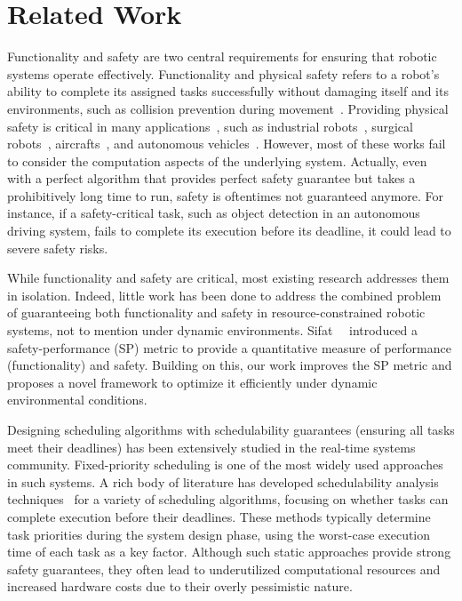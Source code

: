 	\section{Related Work}

	Functionality and safety are two central requirements for ensuring that robotic systems operate
	effectively. Functionality and physical safety refers to a robot's ability to complete its assigned
	tasks successfully without damaging itself and its environments, such as collision prevention during
	movement~\cite{PARIGIPOLVERINI201725, safety20, Vicentini19TRO_Safety, Terra20ICCAR}.
    Providing physical safety is critical in many
	applications~\cite{Vasic2013SafetyII,Ames2016ControlBF, Fisac2017AGS, Xiong2022MultiLayeredSC,
	Singletary2020SafetyCriticalKC}, such as industrial robots~\cite{Bi2021SafetyAM,
	RodrguezGuerra2021HumanRobotIR}, surgical robots~\cite{Haidegger2022RobotAssistedMI},
	aircrafts~\cite{Zipay2016TheUF, Molnr2021ModelFreeSC},
    and autonomous vehicles~\cite{Zheng2023LearningBasedSC, Wang2023PosterEA}.
    However, most of these works fail to consider the computation aspects of the underlying system.
    Actually, even with a perfect algorithm that provides perfect safety guarantee but takes a
    prohibitively long time to run, safety is oftentimes not guaranteed anymore.
    For instance, if a safety-critical task, such as object detection in an autonomous driving system,
    fails to complete its execution before its deadline, it could lead to severe safety risks.

    While functionality and safety are critical, most existing research addresses them in isolation.
    Indeed, little work has been done to address the combined problem of guaranteeing both
    functionality and safety in resource-constrained robotic systems, not to mention under dynamic
    environments. Sifat~\etal~\cite{Ash23RAL} introduced a safety-performance (SP) metric to provide a
    quantitative measure of performance (functionality) and safety. Building on this, our work improves
    the SP metric and proposes a novel framework to optimize it efficiently under dynamic environmental
    conditions.


	Designing scheduling algorithms with schedulability guarantees (\ie ensuring all tasks meet their
	deadlines) has been extensively studied in the real-time systems community. Fixed-priority
	scheduling is one of the most widely used approaches in such systems. A rich body of literature has
	developed schedulability analysis
	techniques~\cite{Liu1973SchedulingAF, Zhao2017AnES, Maxim2013ResponseTA, Maxim2022ProbabilisticA,
	zhao2017virtual, Ueter2021ResponseTimeAA, Gnzel2021SuspensionAwareFS} for a variety of scheduling
	algorithms, focusing on whether tasks can complete execution before their deadlines. These methods
	typically determine task priorities during the system design phase, using the worst-case execution
	time of each task as a key factor. Although such static approaches provide strong safety guarantees,
	they often lead to underutilized computational resources and increased hardware costs due to their
	overly pessimistic nature.


